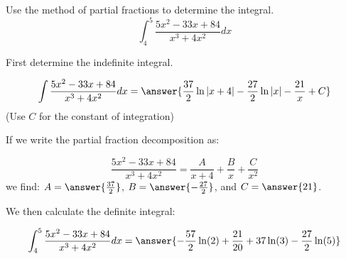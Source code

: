\documentclass{ximera}
\author{Jim Talamo and Jason Miller}
\begin{document}
\begin{exercise}
Use the method of partial fractions to determine the integral.
\[
\int_{4}^{5} \frac{5x^{2}-33x+84}{x^{3}+4x^{2}} dx
\]

First determine the indefinite integral.

\[
\int \frac{5x^{2}-33x+84}{x^{3}+4x^{2}} dx=\answer{ \frac{37}{2} \ln|x+4| -\frac{27}{2}\ln|x| - \frac{21}{x} +C   } 
\]
(Use $C$ for the constant of integration)

\begin{hint}
If we write the partial fraction decomposition as:

\[
 \frac{5x^2-33x+84}{x^3+4x^2} = \frac{A}{x+4}+\frac{B}{x} +\frac{C}{x^2}
\]
we find: $A= \answer{\frac{37}{2}}$, $B= \answer{-\frac{27}{2}}$, and $C = \answer{21}$.
\end{hint}

\begin{exercise}

We then calculate the definite integral: 

\[
\int_{4}^{5} \frac{5x^{2}-33x+84}{x^{3}+4x^{2} } dx=\answer{ -\frac{57}{2} \ln(2)+\frac{21}{20} +37 \ln(3)-\frac{27}{2} \ln(5) }
\]

\end{exercise}
\end{exercise}
\end{document}
